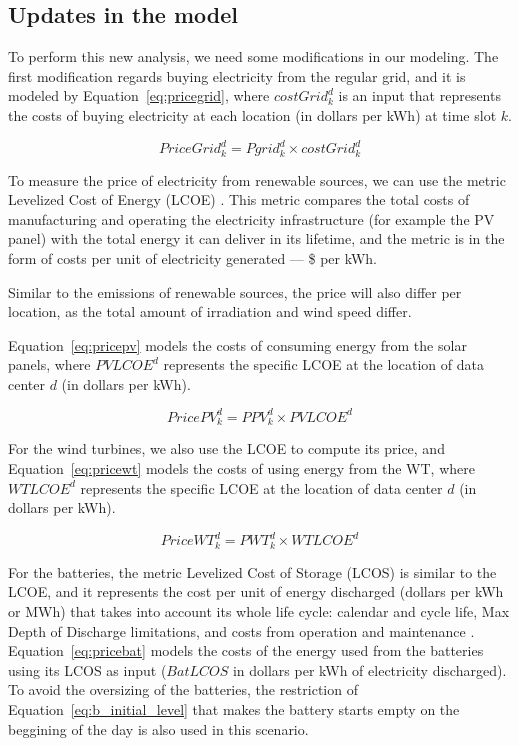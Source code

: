 \subsection{Updates in the model}

To perform this new analysis, we need some modifications in our modeling. The first modification regards buying electricity from the regular grid, and it is modeled by Equation~\eqref{eq:pricegrid}, where $costGrid^d_k$ is an input that represents the costs of buying electricity at each location (in dollars per kWh) at time slot $k$. 

\begin{equation} \label{eq:pricegrid}
 PriceGrid^d_k = Pgrid^d_k \times costGrid^d_k
\end{equation}

To measure the price of electricity from renewable sources, we can use the metric Levelized Cost of Energy (LCOE) \cite{nrel_economic_wt_1995}. This metric compares the total costs of manufacturing and operating the electricity infrastructure (for example the PV panel) with the total energy it can deliver in its lifetime, and the metric is in the form of costs per unit of electricity generated ---  \$ per kWh.

Similar to the  emissions of renewable sources, the price will also differ per location, as the total amount of irradiation and wind speed differ.

Equation~\eqref{eq:pricepv} models the costs of consuming energy from the solar panels, where $PVLCOE^d$ represents the specific LCOE at the location of data center $d$ (in dollars per kWh).

\begin{equation} \label{eq:pricepv}
  PricePV^d_k = PPV^d_k \times PVLCOE^d
\end{equation}


For the wind turbines, we also use the LCOE to compute its price, and Equation~\eqref{eq:pricewt} models the costs of using energy from the WT, where $WTLCOE^d$ represents the specific LCOE at the location of data center $d$ (in dollars per kWh).


\begin{equation} \label{eq:pricewt}
  PriceWT^d_k = PWT^d_k \times WTLCOE^d
\end{equation}

For the batteries, the metric Levelized Cost of Storage (LCOS) is similar to the LCOE, and it represents the cost per unit of energy discharged (dollars per kWh or MWh) that takes into account its whole life cycle: calendar and cycle life, Max Depth of Discharge limitations, and costs from operation and maintenance \cite{battery_lcos_2022}.  Equation~\eqref{eq:pricebat} models the costs of the energy used from the batteries using its LCOS as input ($BatLCOS$ in dollars per kWh of electricity discharged). To avoid the oversizing of the batteries, the restriction of Equation~\eqref{eq:b_initial_level} that makes the battery starts empty on the beggining of the day is also used in this scenario.

